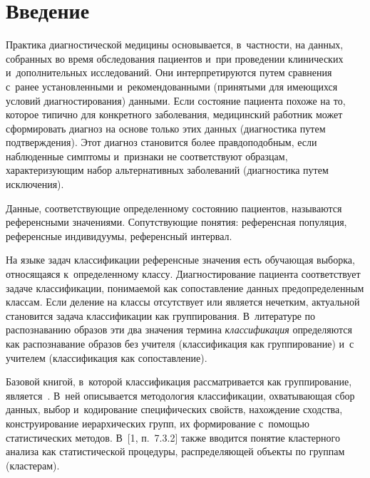 
\thispagestyle{headings}

\begin{multicols}{2}

\label{st\stat}

\section{Введение}

     Практика диагностической медицины основывается, в~частности, на
данных, собранных во время обследования пациентов и~при проведении
клинических и~дополнительных исследований. Они интерпретируются путем
сравнения с~ранее уста\-нов\-лен\-ны\-ми и~рекомендованными (принятыми для
имеющихся условий диагностирования) данными. Если состояние пациента
похоже на то, которое типично для конкретного заболевания, медицинский
работник может сформировать диагноз на основе только этих данных
(диагностика путем под\-тверж\-де\-ния). Этот диагноз становится более
правдоподобным, если наблюденные симптомы и~признаки не соответствуют
образцам, характеризующим набор альтернативных заболеваний (диагностика
путем исключения).

     Данные, соответствующие определенному состоянию пациентов,
называются референсными значениями. Сопутствующие понятия: референсная
популяция, референсные индивидуумы, референсный интервал.

     На языке задач классификации референсные значения есть обучающая
выборка, относящаяся к~определенному классу. Диагностирование пациента
соответствует задаче классификации, понимаемой как сопоставление данных
предопределенным классам. Если деление на классы отсутствует или является
нечетким, актуальной становится задача классификации как группирования.
В~литературе по распознаванию образов эти два значения термина
\textit{классификация} определяются как распознавание образов без учителя
(классификация как группирование) и~с учителем (классификация как
со\-по\-став\-ление).

     Базовой книгой, в~которой классификация рассматривается как
группирование, является~\cite{1-kri}. В~ней описывается методология
классификации, охватывающая сбор данных, выбор и~кодирование
специфических свойств, нахождение сходства, конструирование иерархических
групп, их формирование с~помощью статистических методов. В~[1, п.~7.3.2]
 также вводится понятие кластерного анализа как статистической
процедуры, распределяющей объекты по группам (кластерам).


\end{multicols}
